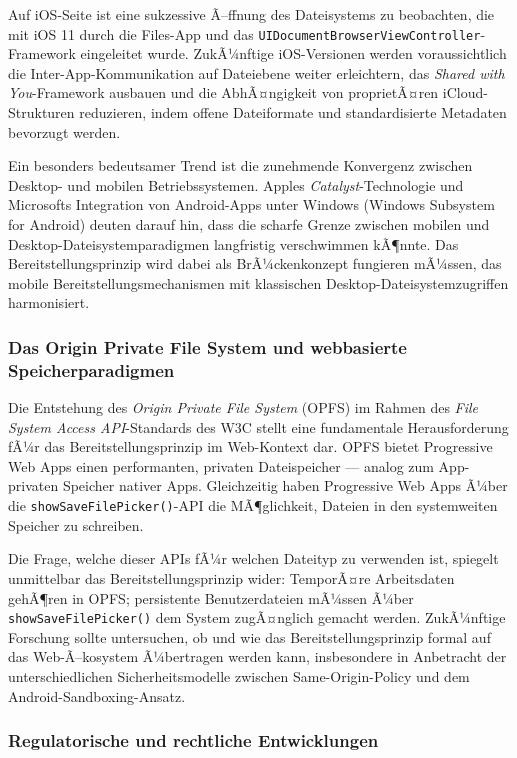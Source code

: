 ﻿\documentclass[12pt, a4paper]{article}
\begin{document}
Auf iOS-Seite ist eine sukzessive Ã–ffnung des Dateisystems zu beobachten, die mit iOS 11
durch die Files-App und das \texttt{UIDocumentBrowserViewController}-Framework eingeleitet
wurde. ZukÃ¼nftige iOS-Versionen werden voraussichtlich die Inter-App-Kommunikation auf
Dateiebene weiter erleichtern, das \emph{Shared with You}-Framework ausbauen und die
AbhÃ¤ngigkeit von proprietÃ¤ren iCloud-Strukturen reduzieren, indem offene Dateiformate und
standardisierte Metadaten bevorzugt werden.

Ein besonders bedeutsamer Trend ist die zunehmende Konvergenz zwischen Desktop- und
mobilen Betriebssystemen. Apples \emph{Catalyst}-Technologie und Microsofts Integration
von Android-Apps unter Windows (Windows Subsystem for Android) deuten darauf hin, dass
die scharfe Grenze zwischen mobilen und Desktop-Dateisystemparadigmen langfristig
verschwimmen kÃ¶nnte. Das Bereitstellungsprinzip wird dabei als BrÃ¼ckenkonzept fungieren
mÃ¼ssen, das mobile Bereitstellungsmechanismen mit klassischen Desktop-Dateisystemzugriffen
harmonisiert.

\subsubsection{Das Origin Private File System und webbasierte Speicherparadigmen}

Die Entstehung des \emph{Origin Private File System} (OPFS) im Rahmen des
\emph{File System Access API}-Standards des W3C stellt eine fundamentale Herausforderung
fÃ¼r das Bereitstellungsprinzip im Web-Kontext dar. OPFS bietet Progressive Web Apps einen
performanten, privaten Dateispeicher --- analog zum App-privaten Speicher nativer Apps.
Gleichzeitig haben Progressive Web Apps Ã¼ber die \texttt{showSaveFilePicker()}-API die
MÃ¶glichkeit, Dateien in den systemweiten Speicher zu schreiben.

Die Frage, welche dieser APIs fÃ¼r welchen Dateityp zu verwenden ist, spiegelt unmittelbar
das Bereitstellungsprinzip wider: TemporÃ¤re Arbeitsdaten gehÃ¶ren in OPFS; persistente
Benutzerdateien mÃ¼ssen Ã¼ber \texttt{showSaveFilePicker()} dem System zugÃ¤nglich gemacht
werden. ZukÃ¼nftige Forschung sollte untersuchen, ob und wie das Bereitstellungsprinzip
formal auf das Web-Ã–kosystem Ã¼bertragen werden kann, insbesondere in Anbetracht der
unterschiedlichen Sicherheitsmodelle zwischen Same-Origin-Policy und dem
Android-Sandboxing-Ansatz.

\subsubsection{Regulatorische und rechtliche Entwicklungen}
\end{document}
